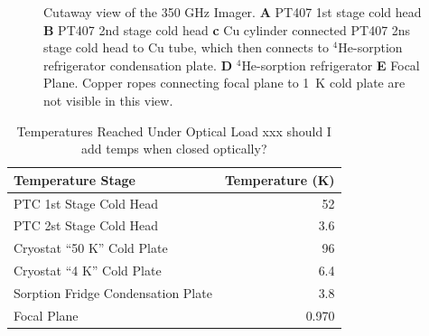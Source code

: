 \documentclass[10pt,twocolumn,article]{memoir}
\newcommand*{\He}[1]{$^{#1}$He\xspace}
\begin{document}
\begin{figure}[t]
\caption{Cutaway view of the 350 GHz Imager. \textbf{A} PT407 1st stage cold head \textbf{B} PT407 2nd stage cold head \textbf{c} Cu cylinder connected PT407 2ns stage cold head to Cu tube, which then connects to \He4-sorption refrigerator condensation plate. \textbf{D} \He4-sorption refrigerator \textbf{E} Focal Plane. Copper ropes connecting focal plane to 1~K cold plate are not visible in this view.}
\label{fig:cryo-cutaway}
\end{figure}

\begin{table}[t]
\centering
\caption{Temperatures Reached Under Optical Load xxx should I add temps when closed optically?}
\label{tab:temp-optical-load}
\begin{tabular}{l r}
\toprule
Temperature Stage &  Temperature (K)\\
\midrule
PTC 1st Stage Cold Head 			& 52 \\
PTC 2st Stage Cold Head 			& 3.6 \\
Cryostat ``50 K'' Cold Plate 		& 96 \\
Cryostat ``4 K'' Cold Plate 			& 6.4 \\
Sorption Fridge Condensation Plate 	& 3.8 \\
Focal Plane 						& 0.970 \\
\bottomrule
\end{tabular}
\end{table}
\end{document}
